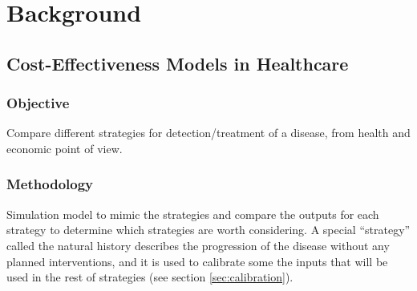 
\chapter{Background} %

\label{sec:background} %


\newcommand{\keyword}[1]{\textbf{#1}}
\newcommand{\tabhead}[1]{\textbf{#1}}
\newcommand{\code}[1]{\texttt{#1}}
\newcommand{\file}[1]{\texttt{\bfseries#1}}
\newcommand{\option}[1]{\texttt{\itshape#1}}


\section{Cost-Effectiveness Models in Healthcare}

\subsection{Objective}
Compare different strategies for detection/treatment of a disease, from health and economic point of view.

\subsection{Methodology}
Simulation model to mimic the strategies and compare the outputs for each strategy to determine which strategies are worth considering. A special ``strategy'' called the natural history describes the progression of the disease without any planned interventions, and it is used to calibrate some the inputs that will be used in the rest of strategies (see section \ref{sec:calibration}).

